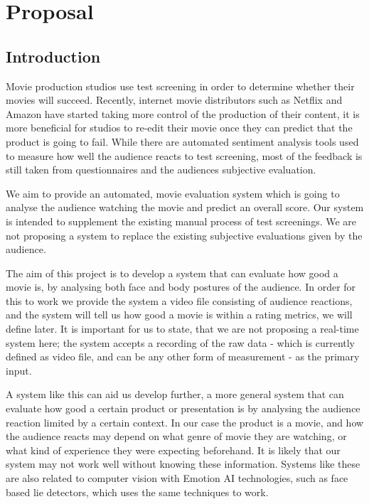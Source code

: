 \documentclass[12pt,a4paper,man]{report}
\begin{document}
\pagestyle{fancy}
\fancyhf{}
\rhead{\thepage}
\lhead{\parttitle{}: \leftmark}
\cfoot{\thepage}
\renewcommand{\chaptermark}[1]{\markboth{#1}{}}

\part{Proposal}
\label{sec:org2a33e90}
\chapter{Introduction}
\label{sec:org20f60a9}

Movie production studios use test screening in order to determine whether their movies will succeed. Recently, internet movie distributors such as Netflix and Amazon have started taking more control of the production of their content, it is more beneficial for studios to re-edit their movie once they can predict that the product is going to fail. While there are automated sentiment analysis tools used to measure how well the audience reacts to test screening, most of the feedback is still taken from questionnaires and the audiences subjective evaluation.

We aim to provide an automated, movie evaluation system which is going to analyse the audience watching the movie and predict an overall score. Our system is intended to supplement the existing manual process of test screenings. We are not proposing a system to replace the existing subjective evaluations given by the audience.

The aim of this project is to develop a system that can evaluate how good a movie is, by analysing both face and body postures of the audience. In order for this to work we provide the system a video file consisting of audience reactions, and the system will tell us how good a movie is within a rating metrics, we will define later. It is important for us to state, that we are not proposing a real-time system here; the system accepts a recording of the raw data - which is currently defined as video file, and can be any other form of measurement - as the primary input.

A system like this can aid us develop further, a more general system that can evaluate how good a certain product or presentation is by analysing the audience reaction limited by a certain context. In our case the product is a movie, and how the audience reacts may depend on what genre of movie they are watching, or what kind of experience they were expecting beforehand. It is likely that our system may not work well without knowing these information. Systems like these are also related to computer vision with Emotion AI technologies, such as face based lie detectors, which uses the same techniques to work.
\end{document}
